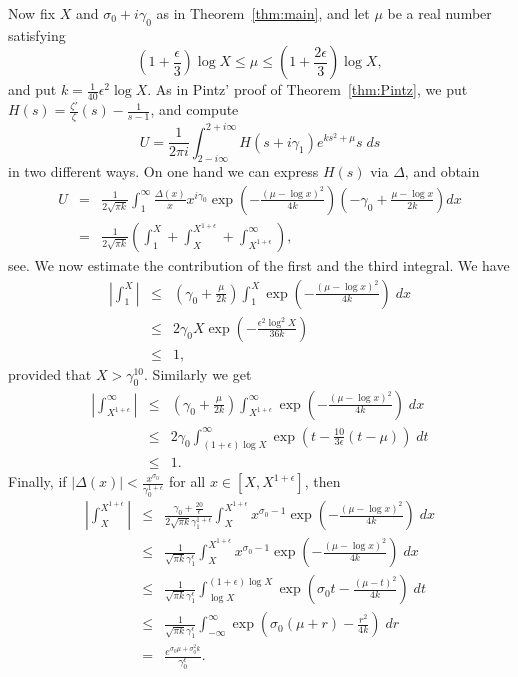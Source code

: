 \documentclass{amsart}
\begin{document}
Now fix $X$ and $\sigma_0+i\gamma_0$ as in Theorem~\ref{thm:main}, and let $\mu$ be a real number satisfying
\begin{equation}
\label{eq:mu def}
\left(1+\frac{\epsilon}{3}\right)\log X\leq\mu\leq \left(1+\frac{2\epsilon}{3}\right)\log X,
\end{equation}
and put $k=\frac{1}{40}\epsilon^2\log X$. As in Pintz' proof of Theorem~\ref{thm:Pintz}, we put $H(s)=\frac{\zeta'}{\zeta}(s)-\frac{1}{s-1}$, and compute 
\[
U=\frac{1}{2\pi i}\int_{2-i\infty}^{2+i\infty} H(s+i\gamma_1)e^{ks^2+\mu} s\;ds
\]
in two different ways. On one hand we can express $H(s)$ via $\Delta$, and obtain
\begin{eqnarray*}
U & = & \frac{1}{2\sqrt{\pi k}}\int_1^\infty\frac{\Delta(x)}{x}x^{i\gamma_0}\exp\left(-\frac{(\mu-\log x)^2}{4k}\right)\left(-\gamma_0+\frac{\mu-\log x}{2k}\right)dx\\
 & = & \frac{1}{2\sqrt{\pi k}}\left(\int_1^X + \int_X^{X^{1+\epsilon}} + \int_{X^{1+\epsilon}}^\infty\right),
\end{eqnarray*}
see\cite[(4.5)]{Pintz}. We now estimate the contribution of the first and the third integral. We have
\begin{eqnarray*}
\left|\int_1^X\right| & \leq & \left(\gamma_0+\frac{\mu}{2k}\right)
\int_1^X\exp\left(-\frac{(\mu-\log x)^2}{4k}\right)\;dx\\
 & \leq & 2\gamma_0 X \exp\left(-\frac{\epsilon^2\log^2 X}{36 k}\right)\\
 & \leq & 1,
\end{eqnarray*}
provided that $X>\gamma_0^{10}$.
Similarly we get
\begin{eqnarray*}
\left|\int_{X^{1+\epsilon}}^\infty\right| & \leq &\left(\gamma_0+\frac{\mu}{2k}\right)
\int_{X^{1+\epsilon}}^\infty\exp\left(-\frac{(\mu-\log x)^2}{4k}\right)\;dx\\
 & \leq & 2\gamma_0 \int_{(1+\epsilon)\log X}^\infty \exp\left(t-\frac{10}{3\epsilon}(t-\mu)\right)\;dt\\
  & \leq & 1.
\end{eqnarray*}
Finally, if $|\Delta(x)|<\frac{x^{\sigma_0}}{\gamma_0^{1+\epsilon}}$ for all $x\in[X, X^{1+\epsilon}]$, then 
\begin{eqnarray*}
\left|\int_X^{X^{1+\epsilon}}\right| & \leq & \frac{\gamma_0+\frac{20}{\epsilon}}{2\sqrt{\pi k}\gamma_1^{1+\epsilon}}\int_X^{X^{1+\epsilon}} x^{\sigma_0-1}\exp\left(-\frac{(\mu-\log x)^2}{4k}\right)\;dx\\
 & \leq & \frac{1}{\sqrt{\pi k}\gamma_1^\epsilon}\int_X^{X^{1+\epsilon}} x^{\sigma_0-1}\exp\left(-\frac{(\mu-\log x)^2}{4k}\right)\;dx\\
  & \leq & \frac{1}{\sqrt{\pi k}\gamma_1^\epsilon}\int_{\log X}^{(1+\epsilon)\log X}\exp\left(\sigma_0t-\frac{(\mu-t)^2}{4k}\right)\;dt\\
   & \leq & \frac{1}{\sqrt{\pi k}\gamma_1^\epsilon}\int_{-\infty}^{\infty}\exp\left(\sigma_0(\mu+r)-\frac{r^2}{4k}\right)\;dr\\
   & = & \frac{e^{\sigma_0\mu+\sigma_0^2k}}{\gamma_0^\epsilon}.
\end{eqnarray*}
\end{document}
